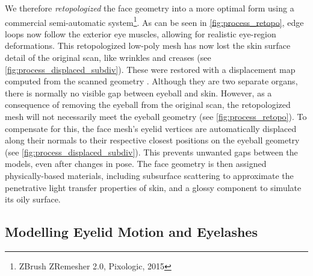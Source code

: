 We therefore \emph{retopologized} the face geometry into a more optimal form using a commercial semi-automatic system\footnote{ZBrush ZRemesher 2.0, Pixologic, 2015}.
As can be seen in \autoref{fig:process_retopo}, edge loops now follow the exterior eye muscles, allowing for realistic eye-region deformations.
This retopologized low-poly mesh has now lost the skin surface detail of the original scan, like wrinkles and creases (see \autoref{fig:process_displaced_subdiv}).
These were restored with a displacement map computed from the scanned geometry \cite{lee2000displaced}.
Although they are two separate organs, there is normally no visible gap between eyeball and skin.
However, as a consequence of removing the eyeball from the original scan, the retopologized mesh will not necessarily meet the eyeball geometry (see \autoref{fig:process_retopo}).
To compensate for this, the face mesh's eyelid vertices are automatically displaced along their normals to their respective closest positions on the eyeball geometry (see \autoref{fig:process_displaced_subdiv}).
This prevents unwanted gaps between the models, even after changes in pose.
The face geometry is then assigned physically-based materials, including subsurface scattering to approximate the penetrative light transfer properties of skin, and a glossy component to simulate its oily surface.

\subsection{Modelling Eyelid Motion and Eyelashes}

